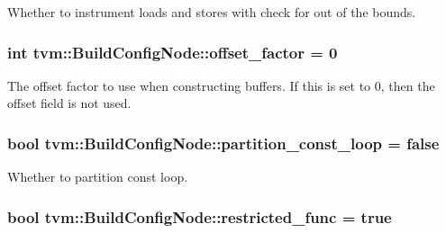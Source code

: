 Whether to instrument loads and stores with check for out of the bounds. 

\subsubsection[{\texorpdfstring{offset\+\_\+factor}{offset_factor}}]{\setlength{\rightskip}{0pt plus 5cm}int tvm\+::\+Build\+Config\+Node\+::offset\+\_\+factor = 0}\hypertarget{classtvm_1_1BuildConfigNode_ab846adeceeb4f6b9b00410b2ce66a4a2}{}\label{classtvm_1_1BuildConfigNode_ab846adeceeb4f6b9b00410b2ce66a4a2}


The offset factor to use when constructing buffers. If this is set to 0, then the offset field is not used. 

\subsubsection[{\texorpdfstring{partition\+\_\+const\+\_\+loop}{partition_const_loop}}]{\setlength{\rightskip}{0pt plus 5cm}bool tvm\+::\+Build\+Config\+Node\+::partition\+\_\+const\+\_\+loop = false}\hypertarget{classtvm_1_1BuildConfigNode_a1ace63c2704b6bd7cb11b41775ed9697}{}\label{classtvm_1_1BuildConfigNode_a1ace63c2704b6bd7cb11b41775ed9697}


Whether to partition const loop. 

\subsubsection[{\texorpdfstring{restricted\+\_\+func}{restricted_func}}]{\setlength{\rightskip}{0pt plus 5cm}bool tvm\+::\+Build\+Config\+Node\+::restricted\+\_\+func = true}\hypertarget{classtvm_1_1BuildConfigNode_a12ea43d3ae7856db884409e74f4451b6}{}\label{classtvm_1_1BuildConfigNode_a12ea43d3ae7856db884409e74f4451b6}


